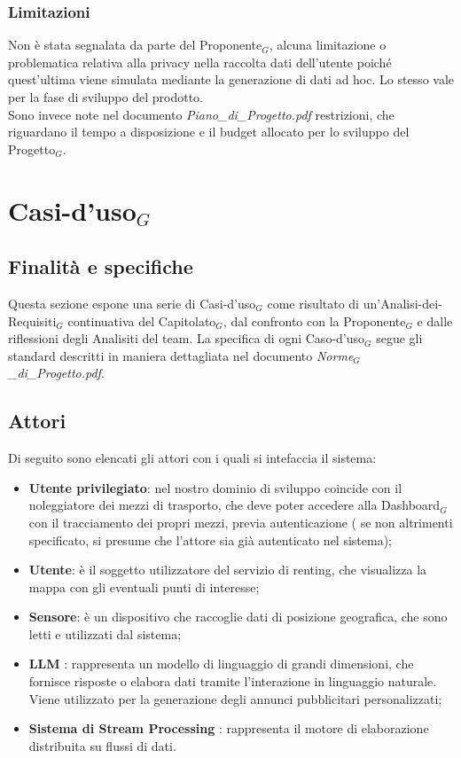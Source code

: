 \documentclass[11pt]{article}
\begin{document}
\begin{justify}
\subsubsection{Limitazioni}
Non è stata segnalata da parte del Proponente$_G$, alcuna limitazione o problematica relativa alla privacy nella raccolta dati dell'utente poiché quest'ultima viene simulata mediante la generazione di dati ad hoc. Lo stesso vale per la fase di sviluppo del prodotto.\\
Sono invece note nel documento \textit{Piano\_di\_Progetto.pdf} restrizioni, che riguardano il tempo a disposizione e il budget allocato per lo sviluppo del Progetto$_G$. 

\newpage
\section{Casi-d'uso$_G$}
\label{sec:casi-uso}

\subsection{Finalità e specifiche}
Questa sezione espone una serie di Casi-d'uso$_G$ come risultato di un'Analisi-dei-Requisiti$_G$ continuativa del Capitolato$_G$, dal confronto con la Proponente$_G$ e dalle riflessioni degli Analisiti del team. La specifica di ogni Caso-d'uso$_G$ segue gli standard descritti in maniera dettagliata nel documento \textit{Norme$_G$\_di\_Progetto.pdf}.
\subsection{Attori}
Di seguito sono elencati gli attori con i quali si intefaccia il sistema:
\begin{itemize}
    \item \textbf{Utente privilegiato}: nel nostro dominio di sviluppo coincide con il noleggiatore dei mezzi di trasporto, che deve poter accedere alla Dashboard$_G$ con il tracciamento dei propri mezzi, previa autenticazione ( se non altrimenti specificato, si presume che l'attore sia già autenticato nel sistema);
    \item \textbf{Utente}: è il soggetto utilizzatore del servizio di renting, che visualizza la mappa con gli eventuali punti di interesse;
    \item \textbf{Sensore}: è un dispositivo che raccoglie dati di posizione geografica, che sono letti e utilizzati dal sistema;
    \item \textbf{LLM} : rappresenta un modello di linguaggio di grandi dimensioni, che fornisce risposte o elabora dati tramite l'interazione in linguaggio naturale. Viene utilizzato per la generazione degli annunci pubblicitari personalizzati;
    \item \textbf{Sistema di Stream Processing} : rappresenta il motore di elaborazione distribuita su flussi di dati.
\end{itemize}


\end{justify}
\end{document}
